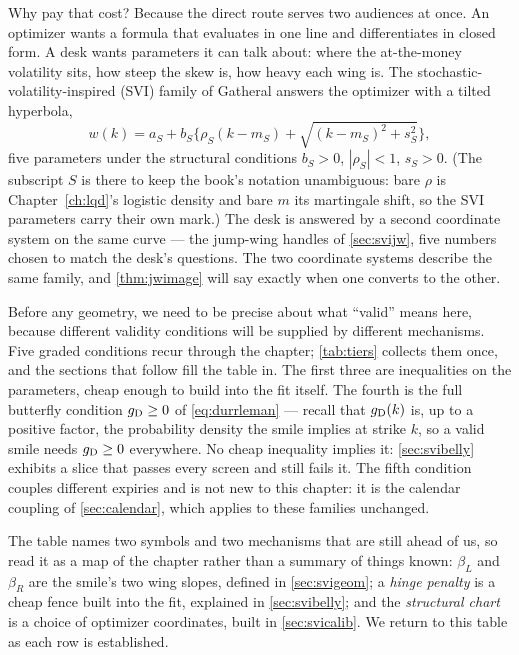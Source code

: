 Why pay that cost?  Because the direct route serves two audiences at
once.  An optimizer wants a formula that evaluates in one line and
differentiates in closed form.  A desk wants parameters it can talk
about: where the at-the-money volatility sits, how steep the skew is,
how heavy each wing is.  The stochastic-volatility-inspired (SVI) family
of Gatheral \citep{Gatheral2004} answers the optimizer with a tilted
hyperbola,
\begin{equation}
\boxed{\;w(k)=a_S+b_S\Big\{\rho_S(k-m_S)+\sqrt{(k-m_S)^2+s_S^2}\Big\},\;}
\label{eq:svi}
\end{equation}
five parameters under the structural conditions $b_S>0$, $|\rho_S|<1$,
$s_S>0$.  (The subscript $S$ is there to keep the book's notation
unambiguous: bare $\rho$ is Chapter~\ref{ch:lqd}'s logistic density and
bare $m$ its martingale shift, so the SVI parameters carry their own
mark.)  The desk is answered by a second coordinate system on the same
curve --- the jump-wing handles of \cref{sec:svijw}, five numbers chosen
to match the desk's questions.  The two coordinate systems describe the
same family, and \cref{thm:jwimage} will say exactly when one converts
to the other.

Before any geometry, we need to be precise about what ``valid'' means
here, because different validity conditions will be supplied by
different mechanisms.  Five graded conditions recur through the chapter;
\cref{tab:tiers} collects them once, and the sections that follow fill
the table in.  The first three are inequalities on the parameters, cheap
enough to build into the fit itself.  The fourth is the full butterfly
condition $g_{\rm D}\ge0$ of \eqref{eq:durrleman} --- recall that
$g_{\rm D}(k)$ is, up to a positive factor, the probability density the
smile implies at strike $k$, so a valid smile needs $g_{\rm D}\ge0$
everywhere.  No cheap inequality implies it: \cref{sec:svibelly}
exhibits a slice that passes every screen and still fails it.  The fifth
condition couples different expiries and is not new to this chapter: it
is the calendar coupling of \cref{sec:calendar}, which applies to these
families unchanged.

The table names two symbols and two mechanisms that are still ahead of
us, so read it as a map of the chapter rather than a summary of things
known: $\beta_L$ and $\beta_R$ are the smile's two wing slopes, defined
in \cref{sec:svigeom}; a \emph{hinge penalty} is a cheap fence built
into the fit, explained in \cref{sec:svibelly}; and the
\emph{structural chart} is a choice of optimizer coordinates, built in
\cref{sec:svicalib}.  We return to this table as each row is
established.


